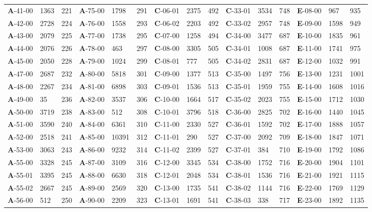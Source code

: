 \begin{table*}
\begin{tabular}{lllllllllllllll}
\textbf{A}-41-00&1363&221&\textbf{A}-75-00&1798&291&\textbf{C}-06-01&2375&492&\textbf{C}-33-01&3534&748&\textbf{E}-08-00&967&935\\
\textbf{A}-42-00&2728&224&\textbf{A}-76-00&1558&293&\textbf{C}-06-02&2203&492&\textbf{C}-33-02&2957&748&\textbf{E}-09-00&1598&949\\
\textbf{A}-43-00&2079&225&\textbf{A}-77-00&1738&295&\textbf{C}-07-00&1258&494&\textbf{C}-34-00&3477&687&\textbf{E}-10-00&1835&961\\
\textbf{A}-44-00&2076&226&\textbf{A}-78-00&463&297&\textbf{C}-08-00&3305&505&\textbf{C}-34-01&1008&687&\textbf{E}-11-00&1741&975\\
\textbf{A}-45-00&2050&228&\textbf{A}-79-00&1024&299&\textbf{C}-08-01&777&505&\textbf{C}-34-02&2831&687&\textbf{E}-12-00&1032&991\\
\textbf{A}-47-00&2687&232&\textbf{A}-80-00&5818&301&\textbf{C}-09-00&1377&513&\textbf{C}-35-00&1497&756&\textbf{E}-13-00&1231&1001\\
\textbf{A}-48-00&2267&234&\textbf{A}-81-00&6898&303&\textbf{C}-09-01&1536&513&\textbf{C}-35-01&1959&755&\textbf{E}-14-00&1608&1016\\
\textbf{A}-49-00&35&236&\textbf{A}-82-00&3537&306&\textbf{C}-10-00&1664&517&\textbf{C}-35-02&2023&755&\textbf{E}-15-00&1712&1030\\
\textbf{A}-50-00&3719&238&\textbf{A}-83-00&512&308&\textbf{C}-10-01&3796&518&\textbf{C}-36-00&2825&702&\textbf{E}-16-00&1440&1045\\
\textbf{A}-51-00&3590&240&\textbf{A}-84-00&6361&310&\textbf{C}-11-00&2330&527&\textbf{C}-36-01&1592&702&\textbf{E}-17-00&1888&1057\\
\textbf{A}-52-00&2518&241&\textbf{A}-85-00&10391&312&\textbf{C}-11-01&290&527&\textbf{C}-37-00&2092&709&\textbf{E}-18-00&1847&1071\\
\textbf{A}-53-00&3063&243&\textbf{A}-86-00&9232&314&\textbf{C}-11-02&2399&527&\textbf{C}-37-01&384&710&\textbf{E}-19-00&1792&1086\\
\textbf{A}-55-00&3328&245&\textbf{A}-87-00&3109&316&\textbf{C}-12-00&3345&534&\textbf{C}-38-00&1752&716&\textbf{E}-20-00&1904&1101\\
\textbf{A}-55-01&3395&245&\textbf{A}-88-00&6630&318&\textbf{C}-12-01&2048&534&\textbf{C}-38-01&1536&716&\textbf{E}-21-00&1921&1115\\
\textbf{A}-55-02&2667&245&\textbf{A}-89-00&2569&320&\textbf{C}-13-00&1735&541&\textbf{C}-38-02&1144&716&\textbf{E}-22-00&1769&1129\\
\textbf{A}-56-00&512&250&\textbf{A}-90-00&2209&323&\textbf{C}-13-01&1691&541&\textbf{C}-38-03&338&717&\textbf{E}-23-00&1892&1135\\

\end{tabular}
\end{table*}
